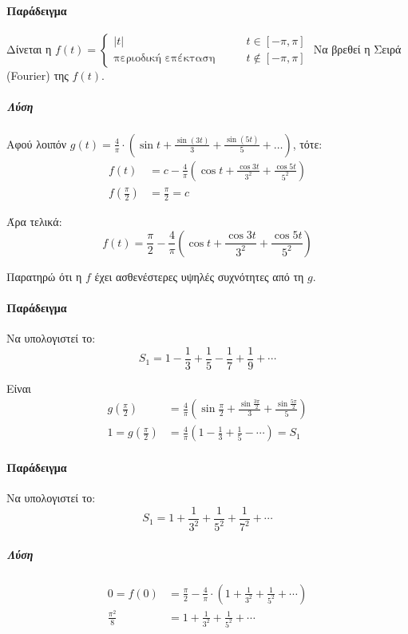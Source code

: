 \documentclass[11pt,a4paper,titlepage,draft]{article}
\begin{document}
\paragraph{Παράδειγμα}
Δίνεται η \(f(t)
= \begin{cases}
|t| &\qquad t \in [-\pi,\pi] \\
\text{περιοδική επέκταση} &\qquad t \notin [-\pi,\pi]
\end{cases}
\)
Να βρεθεί η Σειρά (\textlatin{Fourier}) της \(f(t)\).
\subparagraph{Λύση}
Αφού λοιπόν \(g(t)=
\frac{4}{\pi} \cdot
\left(
\sin t + \frac{\sin(3t)}{3} + \frac{\sin(5t)}{5} + \dots
\right)
\), τότε:
\begin{align*}
f(t) &=
c - \frac{4}{\pi}
\left(
\cos t + \frac{\cos 3t}{3^2}
+ \frac{\cos 5t}{5^2}
\right)
\\ f\left(\frac{\pi}{2}\right) &= \frac{\pi}{2} = c
\end{align*}

Άρα τελικά:
\[
f(t) = \frac{\pi}{2} - \frac{4}{\pi}
\left(
\cos t + \frac{\cos 3t}{3^2}
+ \frac{\cos 5t}{5^2}
\right)
\]

Παρατηρώ ότι η \(f\) έχει ασθενέστερες υψηλές συχνότητες από τη \(g\).

\paragraph{Παράδειγμα}
Να υπολογιστεί το:
\[
S_1 = 1 - \frac{1}{3} + \frac{1}{5} - \frac{1}{7} + \frac{1}{9} + \cdots
\]

Είναι \begin{align*}
g\left( \frac{\pi}{2}\right) &=
\frac{4}{\pi}\left(
\sin \frac{\pi}{2}+\frac{\sin\frac{3\pi}{2}}{3}
+ \frac{\sin\frac{5\pi}{2}}{5}
\right)
\\ 
1 = g\left( \frac{\pi}{2}\right) &= \frac{4}{\pi}
\left(
1-\frac{1}{3}+\frac{1}{5}-\cdots
\right) = S_1
\end{align*}

\paragraph{Παράδειγμα}
Να υπολογιστεί το:
\[
S_1 = 1 + \frac{1}{3^2} + \frac{1}{5^2} + \frac{1}{7^2} + \cdots
\]
\subparagraph{Λύση}
\begin{align*}
0=f(0)&=\frac{\pi}{2} - \frac{4}{\pi} \cdot\left(
1+\frac{1}{3^2}+\frac{1}{5^2}+\cdots
\right)
\\ \frac{\pi^2}{8} &= 1 + \frac{1}{3^2} + \frac{1}{5^2} + \cdots
\end{align*}
\end{document}
